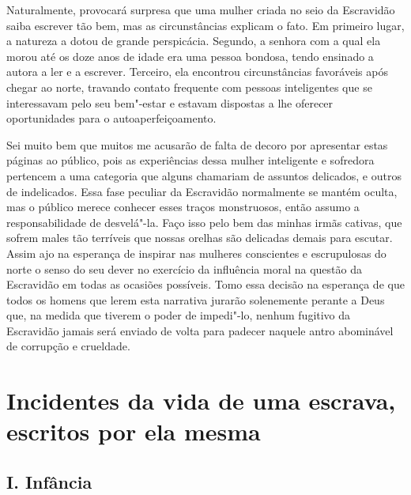 Naturalmente, provocará surpresa que
uma mulher criada no seio da Escravidão saiba escrever tão bem, mas as
circunstâncias explicam o fato. Em primeiro lugar, a natureza a dotou de
grande perspicácia. Segundo, a senhora com a qual ela morou até os doze
anos de idade era uma pessoa bondosa, tendo ensinado a autora a ler e a
escrever. Terceiro, ela encontrou circunstâncias favoráveis após chegar
ao norte, travando contato frequente com pessoas inteligentes que se
interessavam pelo seu bem"-estar e estavam dispostas a lhe oferecer
oportunidades para o autoaperfeiçoamento.

Sei muito bem que muitos me acusarão de
falta de decoro por apresentar estas páginas ao público, pois as
experiências dessa mulher inteligente e sofredora pertencem a uma
categoria que alguns chamariam de assuntos delicados, e outros de
indelicados. Essa fase peculiar da Escravidão normalmente se mantém
oculta, mas o público merece conhecer esses traços monstruosos, então
assumo a responsabilidade de desvelá"-la. Faço isso pelo bem das minhas
irmãs cativas, que sofrem males tão terríveis que nossas orelhas são
delicadas demais para escutar. Assim ajo na esperança de inspirar nas
mulheres conscientes e escrupulosas do norte o senso do seu dever no
exercício da influência moral na questão da Escravidão em todas as
ocasiões possíveis. Tomo essa decisão na esperança de que todos os
homens que lerem esta narrativa jurarão solenemente perante a Deus que,
na medida que tiverem o poder de impedi"-lo,
nenhum fugitivo da Escravidão
jamais será enviado de volta para padecer naquele antro abominável de
corrupção e crueldade.

\part{Incidentes da vida de uma escrava, escritos por ela mesma}
\chapter{I. Infância}

